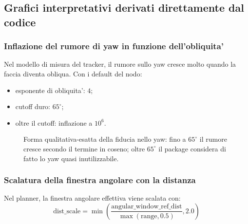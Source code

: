 \documentclass[11pt,a4paper]{article}
\begin{document}
\subsection{Grafici interpretativi derivati direttamente dal codice}

\subsubsection{Inflazione del rumore di yaw in funzione dell'obliquita'}

Nel modello di misura del tracker, il rumore sullo yaw cresce molto quando la faccia diventa obliqua. Con i default del nodo:
\begin{itemize}[leftmargin=1.4em]
  \item esponente di obliquita': \(4\);
  \item cutoff duro: \(65^\circ\);
  \item oltre il cutoff: inflazione a \(10^6\).
\end{itemize}

\begin{figure}[ht]
\centering
{}
\caption{Forma qualitativa-esatta della fiducia nello yaw: fino a \(65^\circ\) il rumore cresce secondo il termine in coseno; oltre \(65^\circ\) il package considera di fatto lo yaw quasi inutilizzabile.}
\end{figure}

\subsubsection{Scalatura della finestra angolare con la distanza}

Nel planner, la finestra angolare effettiva viene scalata con:
\begin{equation}
  \text{dist\_scale} = \min\left(\frac{\text{angular\_window\_ref\_dist}}{\max(\text{range},0.5)}, 2.0\right)
\end{equation}
\end{document}
